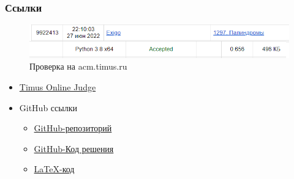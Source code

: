 \documentclass{beamer}
\begin{document}
	\begin{frame}
		\frametitle{Ссылки}
		\begin{figure}
			\includegraphics[scale=0.6]{accepted} %
			\caption{Проверка на acm.timus.ru}
		\end{figure}
		\begin{itemize}
			\item \href{https://acm.timus.ru/}{Timus Online Judge}
			\item {GitHub ссылки
			\begin{itemize}
			\item \href{https://github.com/Nelifax/Summer-practice.git}{GitHub-репозиторий}
			\item \href{https://github.com/Nelifax/Summer-practice/blob/58ef02507143101c32afc2fd39323e81d402ca8e/MVS_Python3x/practice/practice/practice.py}{GitHub-Код решения}
			\item \href{https://github.com/Nelifax/Summer-practice/blob/7bea7073e4a0e0341c1cacd58ebccdce28801e29/LaTeX_work.tex}{LaTeX-код}
			\end{itemize}}
		\end{itemize}
	\end{frame}
\end{document}
